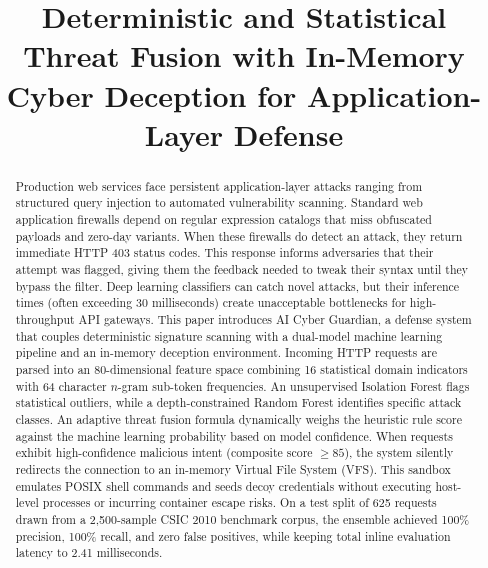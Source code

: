\documentclass[conference]{IEEEtran}
\begin{document}
\title{Deterministic and Statistical Threat Fusion with In-Memory Cyber Deception for Application-Layer Defense}

\author{
}

\maketitle

\begin{abstract}
Production web services face persistent application-layer attacks ranging from structured query injection to automated vulnerability scanning. Standard web application firewalls depend on regular expression catalogs that miss obfuscated payloads and zero-day variants. When these firewalls do detect an attack, they return immediate HTTP 403 status codes. This response informs adversaries that their attempt was flagged, giving them the feedback needed to tweak their syntax until they bypass the filter. Deep learning classifiers can catch novel attacks, but their inference times (often exceeding 30 milliseconds) create unacceptable bottlenecks for high-throughput API gateways. This paper introduces AI Cyber Guardian, a defense system that couples deterministic signature scanning with a dual-model machine learning pipeline and an in-memory deception environment. Incoming HTTP requests are parsed into an 80-dimensional feature space combining 16 statistical domain indicators with 64 character $n$-gram sub-token frequencies. An unsupervised Isolation Forest flags statistical outliers, while a depth-constrained Random Forest identifies specific attack classes. An adaptive threat fusion formula dynamically weighs the heuristic rule score against the machine learning probability based on model confidence. When requests exhibit high-confidence malicious intent (composite score $\ge 85$), the system silently redirects the connection to an in-memory Virtual File System (VFS). This sandbox emulates POSIX shell commands and seeds decoy credentials without executing host-level processes or incurring container escape risks. On a test split of 625 requests drawn from a 2,500-sample CSIC 2010 benchmark corpus, the ensemble achieved 100\% precision, 100\% recall, and zero false positives, while keeping total inline evaluation latency to 2.41 milliseconds.
\end{abstract}
\end{document}

